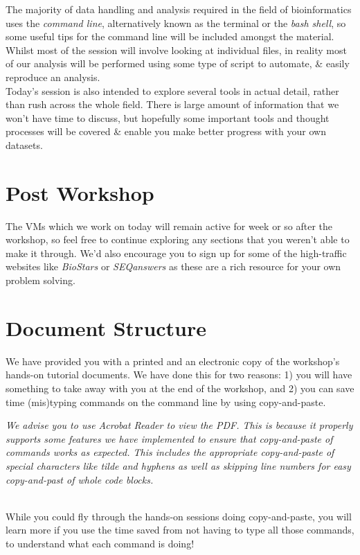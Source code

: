 The majority of data handling and analysis required in the field of bioinformatics uses the \textit{command line}, alternatively known as the terminal or the \textit{bash shell}, so some useful tips for the command line will be included amongst the material.
Whilst most of the session will involve looking at individual files, in reality most of our analysis will be performed using some type of script to automate, \& easily reproduce an analysis. \\

Today's session is also intended to explore several tools in actual detail, rather than rush across the whole field.
There is large amount of information that we won't have time to discuss, but hopefully some important tools and thought processes will be covered \& enable you make better progress with your own datasets.\\

\section{Post Workshop}
The VMs which we work on today will remain active for week or so after the workshop, so feel free to continue exploring any sections that you weren't able to make it through.
We'd also encourage you to sign up for some of the high-traffic websites like \textit{BioStars} or \textit{SEQanswers} as these are a rich resource for your own problem solving.


\section{Document Structure}
We have provided you with a printed and an electronic copy of the workshop's hands-on tutorial documents.
We have done this for two reasons: 1) you will have something to take away with you at the 
end of the workshop, and 2) you can save time (mis)typing commands on the command line by using
copy-and-paste.

\emph{We advise you to use Acrobat Reader to view the PDF. This is because it properly supports some
features we have implemented to ensure that copy-and-paste of commands works as expected. This
includes the appropriate copy-and-paste of special characters like tilde and hyphens as well as
skipping line numbers for easy copy-and-past of whole code blocks.}\\
\\

\begin{warning}
While you could fly through the hands-on sessions doing copy-and-paste, you will learn more if you
use the time saved from not having to type all those commands, to understand what each command is
doing!
\end{warning}

